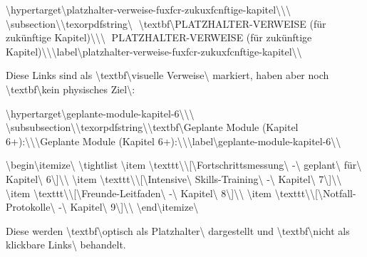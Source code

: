 \textbackslash{}hypertarget\textbackslash{}{platzhalter-verweise-fuxfcr-zukuxfcnftige-kapitel\textbackslash{}}\textbackslash{}{\textbackslash{}%
\textbackslash{}subsection\textbackslash{}{\textbackslash{}texorpdfstring\textbackslash{}{📍 \textbackslash{}textbf\textbackslash{}{PLATZHALTER-VERWEISE (für zukünftige Kapitel)\textbackslash{}}\textbackslash{}}\textbackslash{}{📍 PLATZHALTER-VERWEISE (für zukünftige Kapitel)\textbackslash{}}\textbackslash{}}\textbackslash{}label\textbackslash{}{platzhalter-verweise-fuxfcr-zukuxfcnftige-kapitel\textbackslash{}}\textbackslash{}}

Diese Links sind als \textbackslash{}textbf\textbackslash{}{visuelle Verweise\textbackslash{}} markiert, haben aber noch \textbackslash{}textbf\textbackslash{}{kein physisches Ziel\textbackslash{}}:

\textbackslash{}hypertarget\textbackslash{}{geplante-module-kapitel-6\textbackslash{}}\textbackslash{}{\textbackslash{}%
\textbackslash{}subsubsection\textbackslash{}{\textbackslash{}texorpdfstring\textbackslash{}{\textbackslash{}textbf\textbackslash{}{Geplante Module (Kapitel 6+):\textbackslash{}}\textbackslash{}}\textbackslash{}{Geplante Module (Kapitel 6+):\textbackslash{}}\textbackslash{}}\textbackslash{}label\textbackslash{}{geplante-module-kapitel-6\textbackslash{}}\textbackslash{}}

\textbackslash{}begin\textbackslash{}{itemize\textbackslash{}}
\textbackslash{}tightlist
\textbackslash{}item
  \textbackslash{}texttt\textbackslash{}{\textbackslash{}{[\textbackslash{}}Fortschrittsmessung\textbackslash{} -\textbackslash{} geplant\textbackslash{} für\textbackslash{} Kapitel\textbackslash{} 6\textbackslash{}{]\textbackslash{}}\textbackslash{}}
\textbackslash{}item
  \textbackslash{}texttt\textbackslash{}{\textbackslash{}{[\textbackslash{}}Intensive\textbackslash{} Skills-Training\textbackslash{} -\textbackslash{} Kapitel\textbackslash{} 7\textbackslash{}{]\textbackslash{}}\textbackslash{}}
\textbackslash{}item
  \textbackslash{}texttt\textbackslash{}{\textbackslash{}{[\textbackslash{}}Freunde-Leitfaden\textbackslash{} -\textbackslash{} Kapitel\textbackslash{} 8\textbackslash{}{]\textbackslash{}}\textbackslash{}}
\textbackslash{}item
  \textbackslash{}texttt\textbackslash{}{\textbackslash{}{[\textbackslash{}}Notfall-Protokolle\textbackslash{} -\textbackslash{} Kapitel\textbackslash{} 9\textbackslash{}{]\textbackslash{}}\textbackslash{}}
\textbackslash{}end\textbackslash{}{itemize\textbackslash{}}

Diese werden \textbackslash{}textbf\textbackslash{}{optisch als Platzhalter\textbackslash{}} dargestellt und \textbackslash{}textbf\textbackslash{}{nicht als klickbare Links\textbackslash{}} behandelt.


